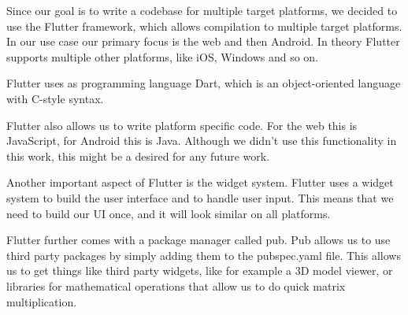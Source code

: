 Since our goal is to write a codebase for multiple target platforms, we decided to use the Flutter framework, which allows compilation to multiple target platforms. In our use case our primary focus is the web
and then Android. In theory Flutter supports multiple other platforms, like iOS, Windows and so on. 

Flutter uses as programming language Dart, which is an object-oriented language with C-style syntax. 

Flutter also allows us to write platform specific code. For the web this is JavaScript, for Android this is Java. Although we didn't use this functionality in this work, this might be a desired for
any future work.

Another important aspect of Flutter is the widget system. Flutter uses a widget system to build the user interface and to handle user input. This means that we need to build our UI once, and it will
look similar on all platforms. 

Flutter further comes with a package manager called pub. Pub allows us to use third party packages by simply adding them to the pubspec.yaml file. This allows us to get things like third party widgets, 
like for example a 3D model viewer, or libraries for mathematical operations that allow us to do quick matrix multiplication.
